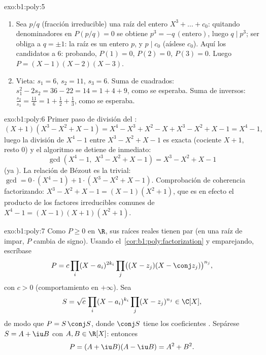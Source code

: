 \begin{solution}{exo:b1:poly:5}
\begin{enumerate}
  \item Sea $p/q$ (fracción irreducible) una raíz del 
        entero  $X^3 + \dots + c_0$: quitando denominadores en
        $P(p/q) = 0$ se obtiene $p^3 = -q\,(\text{entero})$, luego
        $q \mid p^3$; ser  obliga a $q = \pm 1$: la raíz es un
        entero $p$, y $p \mid c_0$ (aíslese $c_0$). Aquí los candidatos
         a $6$: probando, $P(1) = 0$, $P(2) = 0$, $P(3) = 0$.
        Luego $P = (X-1)(X-2)(X-3)$.
  \item Vieta: $s_1 = 6$, $s_2 = 11$, $s_3 = 6$. Suma de cuadrados:
        $s_1^2 - 2s_2 = 36 - 22 = 14 = 1 + 4 + 9$, como se esperaba. Suma de inversos:
        $\frac{s_2}{s_3} = \frac{11}{6} = 1 + \frac12 + \frac13$, como se esperaba.
\end{enumerate}
\end{solution}

\begin{solution}{exo:b1:poly:6}
Primer paso de división del :
\[
(X + 1)(X^3 - X^2 + X - 1)
= X^4 - X^3 + X^2 - X + X^3 - X^2 + X - 1 = X^4 - 1 ,
\]
luego la división de $X^4 - 1$ entre $X^3 - X^2 + X - 1$ es exacta
(cociente $X + 1$, resto $0$) y el algoritmo se detiene de inmediato:
\[
\gcd(X^4 - 1,\; X^3 - X^2 + X - 1) = X^3 - X^2 + X - 1
\]
(ya ). La relación de Bézout es la trivial:
$\gcd = 0 \cdot (X^4 - 1) + 1 \cdot (X^3 - X^2 + X - 1)$. Comprobación
de coherencia factorizando: $X^3 - X^2 + X - 1 = (X - 1)(X^2 + 1)$, que
es en efecto el producto de los factores irreducibles comunes de
$X^4 - 1 = (X-1)(X+1)(X^2+1)$.
\end{solution}

\begin{solution}{exo:b1:poly:7}
Como $P \geq 0$ en $\R$, sus raíces reales tienen  par (en
una raíz de  impar, $P$ cambia de signo). Usando
el~\cref{cor:b1:poly:factorization} y emparejando, escríbase
\[
P = c \prod_i (X - a_i)^{2k_i} \prod_j \bigl((X - z_j)(X - \conj
z_j)\bigr)^{n_j},
\]
con $c > 0$ (comportamiento en $+\infty$). Sea
\[
S = \sqrt c\, \prod_i (X - a_i)^{k_i} \prod_j (X - z_j)^{n_j}
\in \C[X],
\]
de modo que $P = S\,\conj S$, donde $\conj S$ tiene los coeficientes
. Sepárese $S = A + \iu B$ con $A, B \in \R[X]$: entonces
\[
P = (A + \iu B)(A - \iu B) = A^2 + B^2 .
\]
\end{solution}

